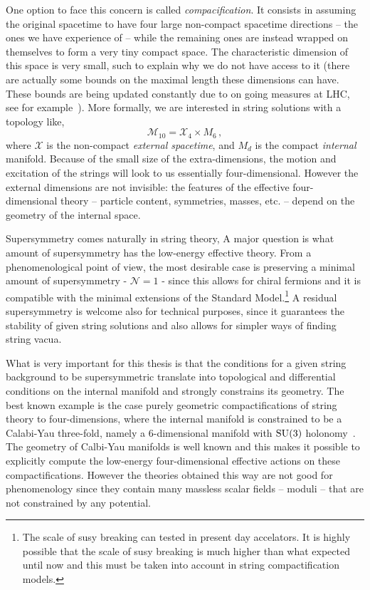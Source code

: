 \documentclass[draft]{phd}
\begin{document}
		One option to face this concern is  called \emph{compacification}.
		It consists in assuming the original spacetime to have four  large non-compact spacetime directions -- the ones we have experience of -- while  the remaining ones are instead wrapped on themselves to form a  very tiny  compact space.
		The characteristic dimension of this space is very small, such to explain why we do not have access to it (there are actually some bounds on the maximal length these dimensions can have. These bounds are being updated constantly due to on going measures at LHC, see for example~\cite{extradim1,extradim2}).
		More formally, we are interested in string solutions  with a topology like,
				\begin{equation*}
					\mathcal{M}_{10} =  \mathcal{X}_4 \times M_6\, ,
				\end{equation*}
		where $\mathcal{X}$ is the non-compact  \emph{external spacetime}, and $M_d$ is the compact \emph{internal} manifold.
		Because of the small size of the extra-dimensions, the motion and excitation of the strings will look to us essentially four-dimensional. 
%		
However the external dimensions are not invisible: the features of the effective four-dimensional theory -- particle content, symmetries, masses, etc. -- 
depend on the geometry of the internal space.

Supersymmetry comes naturally in string theory, A major question is what amount of supersymmetry has the low-energy effective theory.
From a phenomenological point of view, the most desirable case is preserving a minimal amount of supersymmetry - $\mathcal{N}=1$ - since this allows for chiral fermions and it is 
compatible with  the minimal extensions of the Standard Model.\footnote{%
			The scale of susy breaking can tested in present day accelators. It is highly possible that the scale of susy breaking is much higher than what expected
			until now and this must be taken into account in string compactification models.}
A residual supersymmetry is welcome also for technical purposes, since it guarantees the stability of given string solutions and also allows for simpler ways of finding
string vacua.

What is very important for this thesis is that the conditions for a given string background to be supersymmetric 
 translate into topological and differential conditions on  the internal manifold and  strongly constrains its geometry.
 The best known example is the case purely geometric compactifications of string theory to four-dimensions, where the internal manifold is constrained to be 
 a Calabi-Yau three-fold, namely a $6$-dimensional manifold with $\mathrm{SU}(3)$ holonomy~\cite{CYcomp}.
The geometry of Calbi-Yau manifolds is well known and this makes it possible to explicitly compute the  low-energy four-dimensional effective actions on these compactifications.
However the theories obtained this way are not good for phenomenology since  they contain many massless scalar fields -- moduli --  that are not constrained by any potential.
\end{document}

